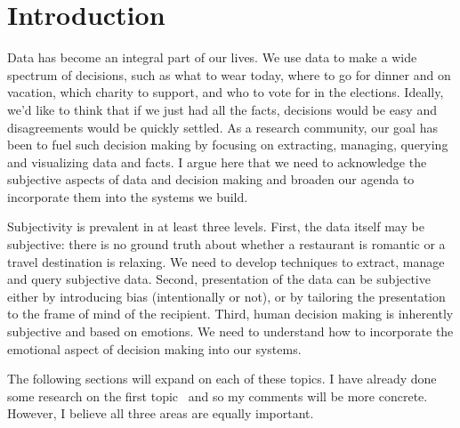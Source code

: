 \documentclass[11pt]{article}
\begin{document}

\begin{abstract}
In order to make effective use of data in decision making, we need to consider aspects of data that our research community has traditionally ignored.  These include the management of subjective data, building unbiased presentations that are tailored to the subjective world-view of the recipient, and finally, the subjective nature of human decision making.
\end{abstract}

\section{Introduction}

Data has become an integral part of our lives. We use data to make a wide spectrum of decisions, such as what to wear today, where to go for dinner and on vacation,  which charity to support, and who to vote for in the elections. Ideally, we'd like to think that if we just had all the facts,  decisions would be easy and disagreements would be quickly settled. As a research community, our goal has been to fuel such decision making by  focusing on  extracting, managing, querying and visualizing data and facts.  I argue here that we need to acknowledge the subjective aspects of data and decision making and broaden our agenda to incorporate them into the systems we build.  

Subjectivity is prevalent in at least three levels. First, the data itself may be subjective: there is no ground truth about whether a restaurant is romantic or a travel destination is relaxing. We need to develop techniques to extract, manage and query subjective data. Second, presentation of the data can be subjective either by introducing bias (intentionally or not), or by tailoring the presentation to the frame of mind of the recipient. Third, human decision making is inherently subjective and based on emotions. We need to understand how to incorporate the emotional aspect of decision making into our systems.  

The following sections will expand on each of these topics.  I have already done some research on the first topic~\cite{subjectivedatabases} and so my comments will be more concrete. However, I believe all three areas are equally important.
\end{document}
